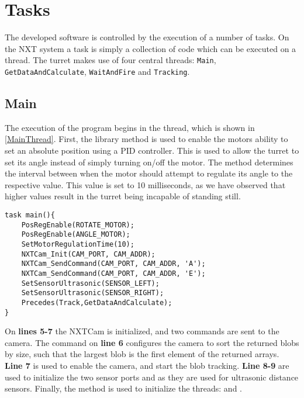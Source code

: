 \section{Tasks}
The developed software is controlled by the execution of a number of
tasks. On the NXT system a task is simply a collection of code which can be
executed on a thread. The turret makes use of four central threads:
\texttt{Main}, \texttt{GetDataAndCalculate}, \texttt{WaitAndFire} and
\texttt{Tracking}.

\subsection{Main}
The execution of the program begins in the  thread, which is shown
in \autoref{MainThread}. First, the library method
 is used to enable the motors ability to set
an absolute position using a PID controller. This is used to allow the turret to
set its angle instead of simply turning on/off the motor.
The  method determines the interval between when
the motor should attempt to regulate its angle to the respective value. This
value is set to 10 milliseconds, as we have observed that higher values result
in the turret being incapable of standing still.

\begin{minipage}[H]{\linewidth}
\begin{lstlisting}[caption = Entry point for the program execution., label = MainThread] 
task main(){
    PosRegEnable(ROTATE_MOTOR);
    PosRegEnable(ANGLE_MOTOR);
    SetMotorRegulationTime(10);
    NXTCam_Init(CAM_PORT, CAM_ADDR);
    NXTCam_SendCommand(CAM_PORT, CAM_ADDR, 'A');
    NXTCam_SendCommand(CAM_PORT, CAM_ADDR, 'E');
    SetSensorUltrasonic(SENSOR_LEFT);
    SetSensorUltrasonic(SENSOR_RIGHT);
    Precedes(Track,GetDataAndCalculate);
}
\end{lstlisting}
\end{minipage}

On \textbf{lines 5-7} the NXTCam is initialized, and two commands are
sent to the camera. The command on \textbf{line 6} configures the camera
to sort the returned blobs by size, such that the largest blob is the first
element of the returned arrays. \textbf{Line 7} is used to enable the camera,
and start the blob tracking. \textbf{Line 8-9} are used to
initialize the two sensor ports  and
 as they are used for ultrasonic distance sensors.
Finally, the  method is used to initialize the
threads:  and .
